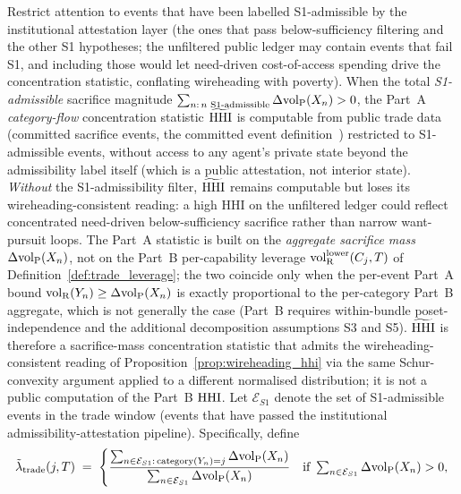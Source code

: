 \begin{proposition}
\label{prop:third_party_wireheading}
Restrict attention to events that have been labelled
S1-admissible by the institutional attestation layer (the
ones that pass below-sufficiency filtering and the other S1
hypotheses; the unfiltered public ledger may contain events
that fail S1, and including those would let
need-driven cost-of-access spending drive the concentration
statistic, conflating wireheading with poverty).  When the
total \emph{S1-admissible} sacrifice magnitude
$\sum_{n :\, n \text{ S1-admissible}} \Delta{\operatorname{vol}_{\mathrm{P}}}(X_n) > 0$,
the Part~A \emph{category-flow} concentration statistic
$\widetilde{\mathrm{HHI}}$ is computable from
public trade data (committed sacrifice events,
the committed event definition~\citep[Revealed~Sacrifice]{lasser2026paper8a})
restricted to S1-admissible events, without access to any
agent's private state beyond the admissibility label itself
(which is a public attestation, not interior state).
\emph{Without} the S1-admissibility filter, $\widetilde{\mathrm{HHI}}$
remains computable but loses its wireheading-consistent
reading: a high HHI on the unfiltered ledger could reflect
concentrated need-driven below-sufficiency sacrifice rather
than narrow want-pursuit loops.  The Part~A statistic is built on the
\emph{aggregate sacrifice mass} $\Delta{\operatorname{vol}_{\mathrm{P}}}(X_n)$, not on the
Part~B per-capability leverage ${\operatorname{vol}_{\mathrm{R}}^{\mathrm{lower}}}(C_j, T)$ of
Definition~\ref{def:trade_leverage}; the two coincide only when
the per-event Part~A bound ${\operatorname{vol}_{\mathrm{R}}}(Y_n) \geq \Delta{\operatorname{vol}_{\mathrm{P}}}(X_n)$ is
exactly proportional to the per-category Part~B aggregate, which
is not generally the case (Part~B requires within-bundle
poset-independence and the additional decomposition assumptions
S3 and S5).  $\widetilde{\mathrm{HHI}}$ is therefore a sacrifice-mass
concentration statistic that admits the
wireheading-consistent reading of
Proposition~\ref{prop:wireheading_hhi} via the same
Schur-convexity argument applied to a different normalised
distribution; it is not a public computation of the Part~B
$\mathrm{HHI}$.  Let $\mathcal{E}_{S1}$ denote the set of S1-admissible
events in the trade window (events that have passed the
institutional admissibility-attestation pipeline).
Specifically, define
\[
  \tilde\lambda_{\mathrm{trade}}(j, T) \;=\;
  \begin{cases}
    \dfrac{\sum_{n \in \mathcal{E}_{S1} :\, \mathrm{category}(Y_{n}) = j}
            \Delta{\operatorname{vol}_{\mathrm{P}}}(X_n)}
         {\sum_{n \in \mathcal{E}_{S1}} \Delta{\operatorname{vol}_{\mathrm{P}}}(X_n)}
      & \text{if } \sum_{n \in \mathcal{E}_{S1}}
        \Delta{\operatorname{vol}_{\mathrm{P}}}(X_n) > 0, \\

\end{cases}\]
\end{proposition}
